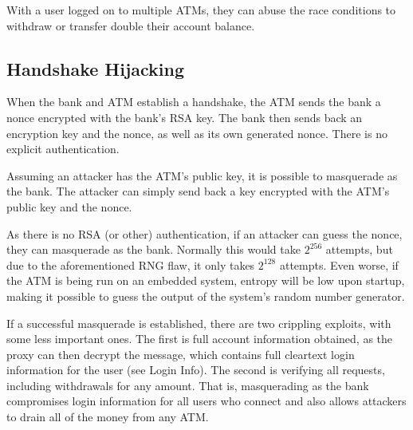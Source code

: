 \documentclass{article}
\begin{document}
With a user logged on to multiple ATMs, they can abuse the race conditions to withdraw or transfer double their account balance.

\subsection{Handshake Hijacking}
When the bank and ATM establish a handshake, the ATM sends the bank a nonce encrypted with the bank's RSA key. The bank then sends back an encryption key and the nonce, as well as its own generated nonce. There is no explicit authentication.

Assuming an attacker has the ATM's public key, it is possible to masquerade as the bank. The attacker can simply send back a key encrypted with the ATM's public key and the nonce.

As there is no RSA (or other) authentication, if an attacker can guess the nonce, they can masquerade as the bank. Normally this would take $2^{256}$ attempts, but due to the aforementioned RNG flaw, it only takes $2^{128}$ attempts. Even worse, if the ATM is being run on an embedded system, entropy will be low upon startup, making it possible to guess the output of the system's random number generator.

If a successful masquerade is established, there are two crippling exploits, with some less important ones. The first is full account information obtained, as the proxy can then decrypt the message, which contains full cleartext login information for the user (see Login Info). The second is verifying all requests, including withdrawals for any amount. That is, masquerading as the bank compromises login information for all users who connect and also allows attackers to drain all of the money from any ATM.
\end{document}
